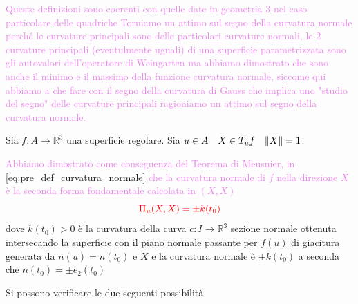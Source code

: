         \textcolor{violet}{Queste definizioni sono coerenti con quelle date in geometria $3$ nel caso particolare delle quadriche}
        \newpage
        \textcolor{violet}{Torniamo un attimo sul segno della curvatura normale perché le curvature principali
        sono delle particolari curvature normali, le $2$ curvature principali (eventulmente uguali) di una superficie parametrizzata
        sono gli autovalori dell'operatore di Weingarten ma abbiamo dimostrato che sono anche il minimo e il massimo della funzione curvatura normale, 
        siccome qui abbiamo a che fare con il segno della curvatura di Gauss che implica uno "studio del segno" delle curvature principali ragioniamo un attimo sul segno della curvatura normale.}
        \begin{osservazione}
        \mbox{}

        Sia $f : A \to \mathbb{R}^3$ una superficie regolare. Sia $u \in A \quad X \in T_{u}f \quad \lVert X\rVert = 1$.
        
        \textcolor{violet}{Abbiamo dimostrato come conseguenza del Teorema di
        Meusnier, in \eqref{eq:pre_def_curvatura_normale} che la curvatura normale di $f$ nella direzione $X$ è la seconda forma fondamentale calcolata in $(X,X)$}
        \[
        \color{red} \Pi_{u}(X,X) = \pm k(t_0) 
        \]
        dove $k(t_0)>0$ è la curvatura della curva $c \colon I \to \mathbb{R}^3$ sezione normale ottenuta intersecando la superficie con il piano normale passante per $f(u)$ di giacitura generata
        da $n(u)=n(t_0)$ e $X$ e la curvatura normale è $\pm k(t_0)$ a seconda che $n(t_0)= \pm e_2(t_0)$ 

        Si possono verificare le due seguenti possibilità


\end{osservazione}
